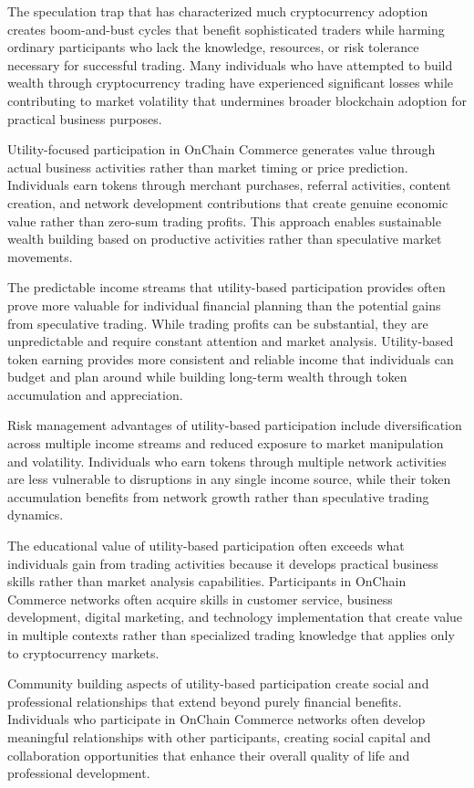 \documentclass[
  Letterpaper,
]{scrbook}
\begin{document}
The speculation trap that has characterized much cryptocurrency adoption
creates boom-and-bust cycles that benefit sophisticated traders while
harming ordinary participants who lack the knowledge, resources, or risk
tolerance necessary for successful trading. Many individuals who have
attempted to build wealth through cryptocurrency trading have
experienced significant losses while contributing to market volatility
that undermines broader blockchain adoption for practical business
purposes.

Utility-focused participation in OnChain Commerce generates value
through actual business activities rather than market timing or price
prediction. Individuals earn tokens through merchant purchases, referral
activities, content creation, and network development contributions that
create genuine economic value rather than zero-sum trading profits. This
approach enables sustainable wealth building based on productive
activities rather than speculative market movements.

The predictable income streams that utility-based participation provides
often prove more valuable for individual financial planning than the
potential gains from speculative trading. While trading profits can be
substantial, they are unpredictable and require constant attention and
market analysis. Utility-based token earning provides more consistent
and reliable income that individuals can budget and plan around while
building long-term wealth through token accumulation and appreciation.

Risk management advantages of utility-based participation include
diversification across multiple income streams and reduced exposure to
market manipulation and volatility. Individuals who earn tokens through
multiple network activities are less vulnerable to disruptions in any
single income source, while their token accumulation benefits from
network growth rather than speculative trading dynamics.

The educational value of utility-based participation often exceeds what
individuals gain from trading activities because it develops practical
business skills rather than market analysis capabilities. Participants
in OnChain Commerce networks often acquire skills in customer service,
business development, digital marketing, and technology implementation
that create value in multiple contexts rather than specialized trading
knowledge that applies only to cryptocurrency markets.

Community building aspects of utility-based participation create social
and professional relationships that extend beyond purely financial
benefits. Individuals who participate in OnChain Commerce networks often
develop meaningful relationships with other participants, creating
social capital and collaboration opportunities that enhance their
overall quality of life and professional development.
\end{document}
